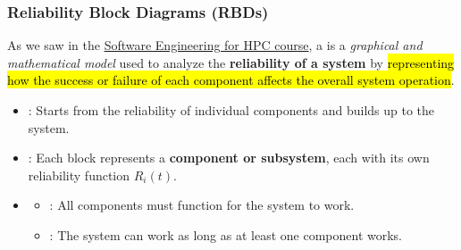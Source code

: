 \newpage

\subsubsection{Reliability Block Diagrams (RBDs)}

As we saw in the \href{https://github.com/PoliMI-HPC-E-notes-projects-AndreVale69/HPC-E-PoliMI-university-notes/tree/main/software-engineering-for-hpc}{Software Engineering for HPC course}, a  is a \emph{graphical and mathematical model} used to analyze the \textbf{reliability of a system} by \hl{representing how the success or failure of each component affects the overall system operation}.
\begin{itemize}
    \item {}: Starts from the reliability of individual components and builds up to the system.
    \item {}: Each block represents a \textbf{component or subsystem}, each with its own reliability function $R_i(t)$.
    \item {}
    \begin{itemize}
        \item {}: All components must function for the system to work.
        \begin{center}
        \end{center}
        \item {}: The system can work as long as at least one component works.
        \begin{center}
\end{center}
\end{itemize}
\end{itemize}
